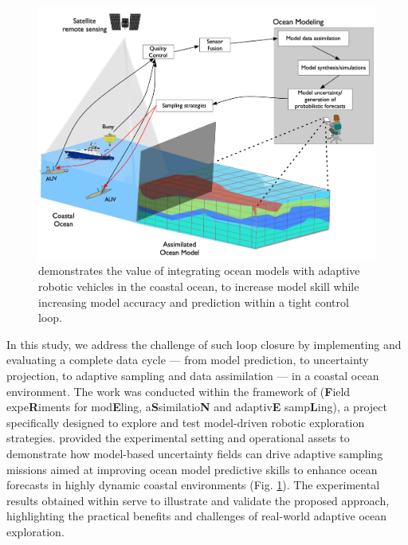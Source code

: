 \begin{figure}[!]
  \centering
  \includegraphics[scale=0.5]{fig/ensemble-2.jpg}
  \caption{\proj demonstrates the value of integrating ocean models
    with adaptive robotic vehicles in the coastal ocean, to increase
    model skill while increasing model accuracy and prediction within
    a tight control loop.}
  \label{fig:block-diag}
\end{figure}


In this study, we address the challenge of such loop closure by
implementing and evaluating a complete data cycle — from model
prediction, to uncertainty projection, to adaptive sampling and data
assimilation — in a coastal ocean environment. The work was conducted
within the framework of \proj (\textbf{F}ield expe\textbf{R}iments for
mod\textbf{E}ling, a\textbf{S}similatio\textbf{N} and
adaptiv\textbf{E} samp\textbf{L}ing), a project specifically designed
to explore and test model-driven robotic exploration strategies. \proj
provided the experimental setting and operational assets to
demonstrate how model-based uncertainty fields can drive adaptive
sampling missions aimed at improving ocean model predictive
skills %
to enhance ocean forecasts in highly dynamic coastal environments
(Fig. \ref{fig:block-diag}). The experimental results obtained within
\proj serve to illustrate and validate the proposed approach,
highlighting the practical benefits and challenges of real-world
adaptive ocean exploration.


